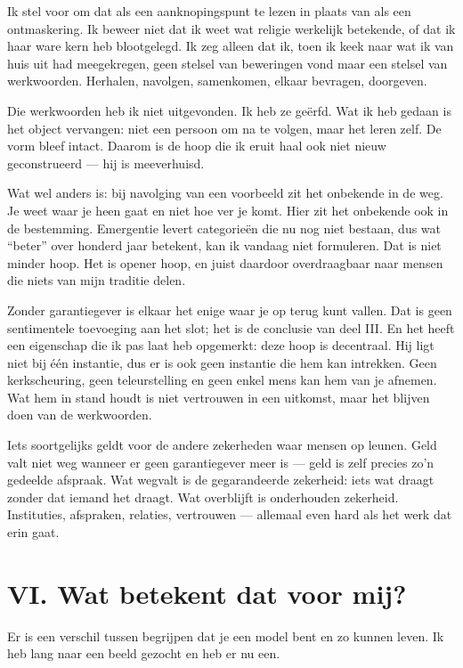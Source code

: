 \documentclass[11pt,a4paper]{article}
\begin{document}
Ik stel voor om dat als een aanknopingspunt te lezen in plaats van als een ontmaskering. Ik beweer niet dat ik weet wat religie werkelijk betekende, of dat ik haar ware kern heb blootgelegd. Ik zeg alleen dat ik, toen ik keek naar wat ik van huis uit had meegekregen, geen stelsel van beweringen vond maar een stelsel van werkwoorden. Herhalen, navolgen, samenkomen, elkaar bevragen, doorgeven.

Die werkwoorden heb ik niet uitgevonden. Ik heb ze geërfd. Wat ik heb gedaan is het object vervangen: niet een persoon om na te volgen, maar het leren zelf. De vorm bleef intact. Daarom is de hoop die ik eruit haal ook niet nieuw geconstrueerd --- hij is meeverhuisd.

Wat wel anders is: bij navolging van een voorbeeld zit het onbekende in de weg. Je weet waar je heen gaat en niet hoe ver je komt. Hier zit het onbekende ook in de bestemming. Emergentie levert categorieën die nu nog niet bestaan, dus wat \enquote{beter} over honderd jaar betekent, kan ik vandaag niet formuleren. Dat is niet minder hoop. Het is opener hoop, en juist daardoor overdraagbaar naar mensen die niets van mijn traditie delen.

Zonder garantiegever is elkaar het enige waar je op terug kunt vallen. Dat is geen sentimentele toevoeging aan het slot; het is de conclusie van deel III. En het heeft een eigenschap die ik pas laat heb opgemerkt: deze hoop is decentraal. Hij ligt niet bij één instantie, dus er is ook geen instantie die hem kan intrekken. Geen kerkscheuring, geen teleurstelling en geen enkel mens kan hem van je afnemen. Wat hem in stand houdt is niet vertrouwen in een uitkomst, maar het blijven doen van de werkwoorden.

Iets soortgelijks geldt voor de andere zekerheden waar mensen op leunen. Geld valt niet weg wanneer er geen garantiegever meer is --- geld is zelf precies zo'n gedeelde afspraak. Wat wegvalt is de gegarandeerde zekerheid: iets wat draagt zonder dat iemand het draagt. Wat overblijft is onderhouden zekerheid. Instituties, afspraken, relaties, vertrouwen --- allemaal even hard als het werk dat erin gaat.

\section*{VI. Wat betekent dat voor mij?}

Er is een verschil tussen begrijpen dat je een model bent en zo kunnen leven. Ik heb lang naar een beeld gezocht en heb er nu een.
\end{document}
